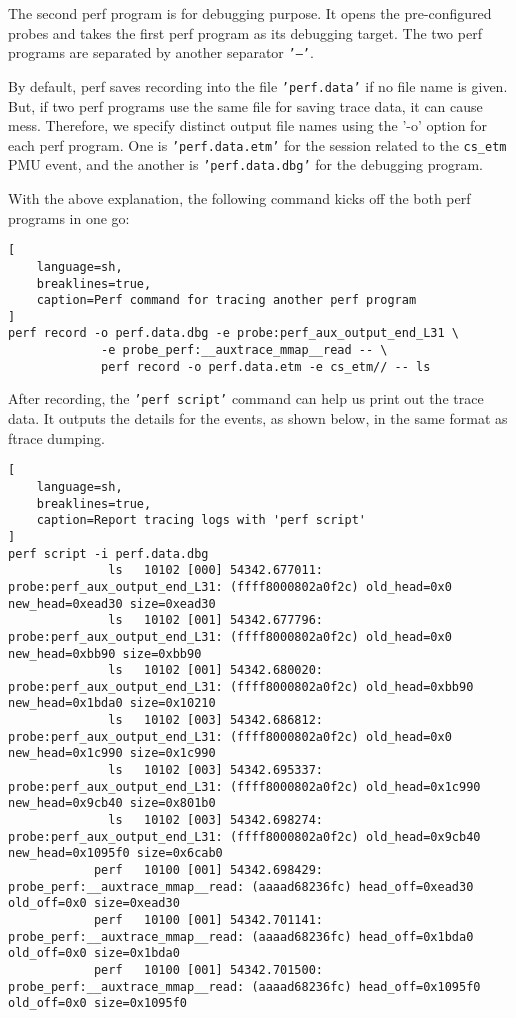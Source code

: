 \documentclass[11pt]{diazessay} %
\def\code#1{\texttt{#1}}
\begin{document}
The second perf program is for debugging purpose. It opens the pre-configured
probes and takes the first perf program as its debugging target. The two perf
programs are separated by another separator \code{'---'}.

By default, perf saves recording into the file \code{'perf.data'} if no file
name is given. But, if two perf programs use the same file for saving trace
data, it can cause mess. Therefore, we specify distinct output file names
using the '-o' option for each perf program. One is \code{'perf.data.etm'} for
the session related to the \code{cs\_etm} PMU event, and the another is
\code{'perf.data.dbg'} for the debugging program.

With the above explanation, the following command kicks off the both perf
programs in one go:

\begin{lstlisting}[
  	language=sh,
	breaklines=true,
	caption=Perf command for tracing another perf program
]
perf record -o perf.data.dbg -e probe:perf_aux_output_end_L31 \
             -e probe_perf:__auxtrace_mmap__read -- \
             perf record -o perf.data.etm -e cs_etm// -- ls
\end{lstlisting}

After recording, the \code{'perf script'} command can help us print out the
trace data. It outputs the details for the events, as shown below, in the same
format as ftrace dumping.

\begin{lstlisting}[
  	language=sh,
	breaklines=true,
	caption=Report tracing logs with 'perf script'
]
perf script -i perf.data.dbg
              ls   10102 [000] 54342.677011:    probe:perf_aux_output_end_L31: (ffff8000802a0f2c) old_head=0x0 new_head=0xead30 size=0xead30
              ls   10102 [001] 54342.677796:    probe:perf_aux_output_end_L31: (ffff8000802a0f2c) old_head=0x0 new_head=0xbb90 size=0xbb90
              ls   10102 [001] 54342.680020:    probe:perf_aux_output_end_L31: (ffff8000802a0f2c) old_head=0xbb90 new_head=0x1bda0 size=0x10210
              ls   10102 [003] 54342.686812:    probe:perf_aux_output_end_L31: (ffff8000802a0f2c) old_head=0x0 new_head=0x1c990 size=0x1c990
              ls   10102 [003] 54342.695337:    probe:perf_aux_output_end_L31: (ffff8000802a0f2c) old_head=0x1c990 new_head=0x9cb40 size=0x801b0
              ls   10102 [003] 54342.698274:    probe:perf_aux_output_end_L31: (ffff8000802a0f2c) old_head=0x9cb40 new_head=0x1095f0 size=0x6cab0
            perf   10100 [001] 54342.698429: probe_perf:__auxtrace_mmap__read: (aaaad68236fc) head_off=0xead30 old_off=0x0 size=0xead30
            perf   10100 [001] 54342.701141: probe_perf:__auxtrace_mmap__read: (aaaad68236fc) head_off=0x1bda0 old_off=0x0 size=0x1bda0
            perf   10100 [001] 54342.701500: probe_perf:__auxtrace_mmap__read: (aaaad68236fc) head_off=0x1095f0 old_off=0x0 size=0x1095f0
\end{lstlisting}
\end{document}
